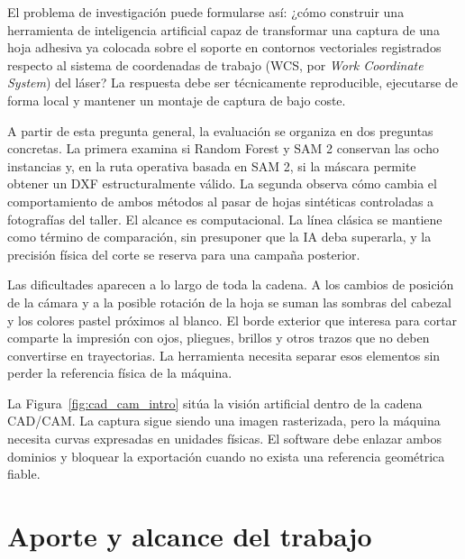 El problema de investigación puede formularse así: ¿cómo construir una herramienta de inteligencia artificial capaz de transformar una captura de una hoja adhesiva ya colocada sobre el soporte en contornos vectoriales registrados respecto al sistema de coordenadas de trabajo (WCS, por \textit{Work Coordinate System}) del láser? La respuesta debe ser técnicamente reproducible, ejecutarse de forma local y mantener un montaje de captura de bajo coste.

A partir de esta pregunta general, la evaluación se organiza en dos preguntas concretas. La primera examina si Random Forest y SAM 2 conservan las ocho instancias y, en la ruta operativa basada en SAM 2, si la máscara permite obtener un DXF estructuralmente válido. La segunda observa cómo cambia el comportamiento de ambos métodos al pasar de hojas sintéticas controladas a fotografías del taller. El alcance es computacional. La línea clásica se mantiene como término de comparación, sin presuponer que la IA deba superarla, y la precisión física del corte se reserva para una campaña posterior.

Las dificultades aparecen a lo largo de toda la cadena. A los cambios de posición de la cámara y a la posible rotación de la hoja se suman las sombras del cabezal y los colores pastel próximos al blanco. El borde exterior que interesa para cortar comparte la impresión con ojos, pliegues, brillos y otros trazos que no deben convertirse en trayectorias. La herramienta necesita separar esos elementos sin perder la referencia física de la máquina.


La Figura~\ref{fig:cad_cam_intro} sitúa la visión artificial dentro de la cadena CAD/CAM. La captura sigue siendo una imagen rasterizada, pero la máquina necesita curvas expresadas en unidades físicas. El software debe enlazar ambos dominios y bloquear la exportación cuando no exista una referencia geométrica fiable.

\section{Aporte y alcance del trabajo}

